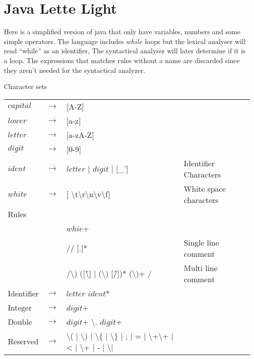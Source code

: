 \chapter{Java Lette Light}\label{reglang}
Here is a simplified version of java that only have variables, numbers and some
simple operators. The language includes $while$ loops but the lexical analyser
will read ``while'' as an identifier, The syntactical analyser will later
determine if it is a loop. The expressions that matches rules without a name
are discarded since they aren't needed for the syntactical analyzer.

Character sets\\
\begin{tabular}{l c l l}
$capital$ & $\rightarrow$ & [A-Z]\\
$lower$   & $\rightarrow$ & [a-z]\\
$letter$  & $\rightarrow$ & [a-zA-Z]\\
$digit$   & $\rightarrow$ & [0-9]\\
$ident$   & $\rightarrow$ & $letter$ | $digit$ | [\_'] & Identifier Characters\\
$white$   & $\rightarrow$ & [ \textbackslash{t}\textbackslash{r}\textbackslash{n}\textbackslash{v}\textbackslash{f}] & White space characters\\
Rules\\
& & $whie$+\\
& & // [.]* & Single line comment\\
& & /\textbackslash*) ([\^\textbackslash*] | (\textbackslash*) [\^/])*
    (\textbackslash*)+ / & Multi line comment\\
Identifier & $\rightarrow$ & $letter$ $ident$*\\
Integer    & $\rightarrow$ & $digit$+\\
Double     & $\rightarrow$ & $digit$+ \textbackslash. $digit$+\\
Reserved   & $\rightarrow$ & \textbackslash( | \textbackslash) | \textbackslash\{
                         | \textbackslash\} | ; | = | \textbackslash+\textbackslash+
                         | < | \textbackslash+ | - | \textbackslash* | \/ \\ %
\end{tabular}
